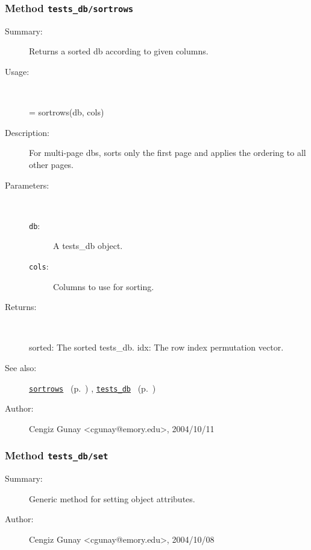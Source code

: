 \subsubsection[Method \texttt{sortrows}]{Method \texttt{tests\_db/sortrows}}%
%
\label{ref_tests_db__sortrows}%
\hypertarget{ref_tests_db__sortrows}{}%
\begin{description}
\item[Summary:]Returns a sorted db according to given columns. 
%
\item[Usage:]~%
\begin{lyxcode}%
[sorted, idx] = sortrows(db, cols)
%
\end{lyxcode}%
%
\item[Description:]%
For multi-page dbs, sorts only the first page and applies the ordering 
 to all other pages.
\item[Parameters:]~
\begin{description}%
\item[\texttt{db}:]
 A tests\_db object.
\item[\texttt{cols}:]
 Columns to use for sorting.
\end{description}%
%
\item[Returns:]~

	sorted: The sorted tests\_db.
	idx: The row index permutation vector. 
%
%
\item[See also:]%
\hyperlink{ref_sortrows}{\texttt{sortrows}}%
\ (p.~\pageref{ref_sortrows})%
%
, \hyperlink{ref_tests_db}{\texttt{tests\_db}}%
\ (p.~\pageref{ref_tests_db})%
%
%
\item[Author:]%
Cengiz Gunay <cgunay@emory.edu>, 2004/10/11%
\end{description}
\methodline%
\subsubsection[Method \texttt{set}]{Method \texttt{tests\_db/set}}%
%
\label{ref_tests_db__set}%
\hypertarget{ref_tests_db__set}{}%
\begin{description}
\item[Summary:]Generic method for setting object attributes.
%
%
%
%
%
%
%
\item[Author:]%
Cengiz Gunay <cgunay@emory.edu>, 2004/10/08%
\end{description}
\methodline%
